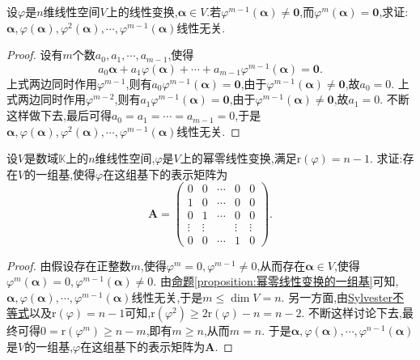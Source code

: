 \documentclass[../../main.tex]{subfiles}%
\begin{document}
\begin{proposition}\label{proposition:幂零线性变换的一组基}
设\(\varphi\)是\(n\)维线性空间\(V\)上的线性变换,$\boldsymbol{\alpha}\in V$.若$\varphi^{m - 1}(\boldsymbol{\alpha})\neq\boldsymbol{0}$,而$\varphi^{m}(\boldsymbol{\alpha})=\boldsymbol{0}$,求证:\(\boldsymbol{\alpha},\varphi(\boldsymbol{\alpha}),\varphi^{2}(\boldsymbol{\alpha}),\cdots,\varphi^{m - 1}(\boldsymbol{\alpha})\)线性无关.
\end{proposition}
\begin{proof}
设有\(m\)个数\(a_0,a_1,\cdots,a_{m - 1}\),使得
\[
a_0\boldsymbol{\alpha}+a_1\varphi(\boldsymbol{\alpha})+\cdots+a_{m - 1}\varphi^{m - 1}(\boldsymbol{\alpha})=\boldsymbol{0}.
\]
上式两边同时作用\(\varphi^{m - 1}\),则有\(a_0\varphi^{m - 1}(\boldsymbol{\alpha})=\boldsymbol{0}\),由于\(\varphi^{m - 1}(\boldsymbol{\alpha})\neq\boldsymbol{0}\),故\(a_0 = 0\). 上式两边同时作用\(\varphi^{m - 2}\),则有\(a_1\varphi^{m - 1}(\boldsymbol{\alpha})=\boldsymbol{0}\),由于\(\varphi^{m - 1}(\boldsymbol{\alpha})\neq\boldsymbol{0}\),故\(a_1 = 0\). 不断这样做下去,最后可得\(a_0 = a_1=\cdots=a_{m - 1}=0\),于是\(\boldsymbol{\alpha},\varphi(\boldsymbol{\alpha}),\varphi^{2}(\boldsymbol{\alpha}),\cdots,\varphi^{m - 1}(\boldsymbol{\alpha})\)线性无关.
\end{proof}

\begin{corollary}\label{corollary:幂零线性变换基的表示矩阵}
设\(V\)是数域\(\mathbb{K}\)上的\(n\)维线性空间,\(\varphi\)是\(V\)上的幂零线性变换,满足\(\mathrm{r}(\varphi)=n - 1\). 求证:存在\(V\)的一组基,使得\(\varphi\)在这组基下的表示矩阵为
\[
\boldsymbol{A}=\begin{pmatrix}
0&0&\cdots&0&0\\
1&0&\cdots&0&0\\
0&1&\cdots&0&0\\
\vdots&\vdots&&\vdots&\vdots\\
0&0&\cdots&1&0
\end{pmatrix}.
\]
\end{corollary}
\begin{proof}
由假设存在正整数\(m\),使得\(\varphi^{m}=0,\varphi^{m - 1}\neq 0\),从而存在\(\boldsymbol{\alpha}\in V\),使得\(\varphi^{m}(\boldsymbol{\alpha}) = 0,\varphi^{m - 1}(\boldsymbol{\alpha})\neq 0\). 由\hyperref[proposition:幂零线性变换的一组基]{命题\ref{proposition:幂零线性变换的一组基}}可知,\(\boldsymbol{\alpha},\varphi(\boldsymbol{\alpha}),\cdots,\varphi^{m - 1}(\boldsymbol{\alpha})\)线性无关,于是\(m\leqslant \dim V=n\). 另一方面,由\hyperref[proposition:Sylvester(西尔维斯特)不等式]{Sylvester不等式}以及\(\mathrm{r}(\varphi)=n - 1\)可知,\(\mathrm{r}(\varphi^{2})\geqslant  2\mathrm{r}(\varphi)-n=n - 2\). 不断这样讨论下去,最终可得\(0=\mathrm{r}(\varphi^{m})\geqslant  n - m\),即有\(m\geqslant  n\),从而\(m = n\). 于是\(\boldsymbol{\alpha},\varphi(\boldsymbol{\alpha}),\cdots,\varphi^{n - 1}(\boldsymbol{\alpha})\)是\(V\)的一组基,\(\varphi\)在这组基下的表示矩阵为\(\boldsymbol{A}\).
\end{proof}
\end{document}
